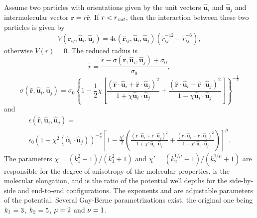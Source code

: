 Assume two particles with orientations given by the unit vectors
$\mathbf{\hat{u}}_i$ and $\mathbf{\hat{u}}_j$ and intermolecular vector
$\mathbf{r} = r\mathbf{\hat{r}}$. If $r<r_\mathrm{\mathrm{\mathit{cut}}}$, then the
interaction between these two particles is given by
\begin{equation}
  V(\mathbf{r}_{ij}, \mathbf{\hat{u}}_i, \mathbf{\hat{u}}_j) = 4
  \epsilon(\mathbf{\hat{r}}_{ij}, \mathbf{\hat{u}}_i,
  \mathbf{\hat{u}}_j) \left( \tilde{r}_{ij}^{-12}-\tilde{r}_{ij}^{-6}
  \right),
\end{equation}
otherwise $V(r)=0$. The reduced radius is
\begin{equation}
  \tilde{r}=\frac{r - \sigma(\mathbf{\hat{r}},
    \mathbf{\hat{u}}_i, \mathbf{\hat{u}}_j)+\sigma_0}{\sigma_0},
\end{equation}
\begin{equation}
  \sigma( \mathbf{\hat{r}}, \mathbf{\hat{u}}_i,
  \mathbf{\hat{u}}_j) = \sigma_{0} \left\{ 1 - \frac{1}{2} \chi \left[
      \frac{ \left( \mathbf{\hat{r}} \cdot \mathbf{\hat{u}}_i +
          \mathbf{\hat{r}} \cdot \mathbf{\hat{u}}_j \right)^{2} }
      {1 + \chi \mathbf{\hat{u}}_i \cdot \mathbf{\hat{u}}_j } +
      \frac{ \left( \mathbf{\hat{r}} \cdot \mathbf{\hat{u}}_i -
          \mathbf{\hat{r}} \cdot \mathbf{\hat{u}}_j \right)^{2} }
      {1 - \chi \mathbf{\hat{u}}_i \cdot \mathbf{\hat{u}}_j}
    \right] \right\}^{-\frac{1}{2}}
\end{equation}
and
\begin{multline}
  \epsilon(\mathbf{\hat{r}}, \mathbf{\hat{u}}_i,
  \mathbf{\hat{u}}_j) = \\
  \epsilon_0 \left( 1- \chi^{2}(\mathbf{\hat{u}}_i
    \cdot \mathbf{\hat{u}}_j) \right)^{-\frac {\nu}{2}} \left[1-\frac
    {\chi'}{2} \left( \frac { (\mathbf{\hat{r}} \cdot
        \mathbf{\hat{u}}_i+ \mathbf{\hat{r}} \cdot
        \mathbf{\hat{u}}_j)^{2}} {1+\chi' \, \mathbf{\hat{u}}_i \cdot
        \mathbf{\hat{u}}_j }+ \frac {(\mathbf{\hat{r}} \cdot
        \mathbf{\hat{u}}_i-\mathbf{\hat{r}} \cdot
        \mathbf{\hat{u}}_j)^{2}} {1-\chi' \, \mathbf{\hat{u}}_i \cdot
        \mathbf{\hat{u}}_j } \right) \right]^{\mu}.
\end{multline}
The parameters $\chi = \left(k_1^{2} - 1\right)/\left(k_1^{2} +
  1\right)$ and $\chi' = \left(k_2^{1/\mu} -
  1\right)/\left(k_2^{1/\mu} + 1\right)$ are responsible for the
degree of anisotropy of the molecular properties.   is the
molecular elongation, and  is the ratio of the potential well
depths for the side-by-side and end-to-end configurations.  The
exponents \var{\mu} and \var{\nu} are adjustable parameters of the
potential.  Several Gay-Berne parametrizations exist, the original one
being $\mathrm{\mathit{k_1}} = 3$, $\mathrm{\mathit{k_2}} = 5$, $\mathrm{\mathit{\mu}} = 2$ and $\mathrm{\mathit{\nu}}
= 1$.

